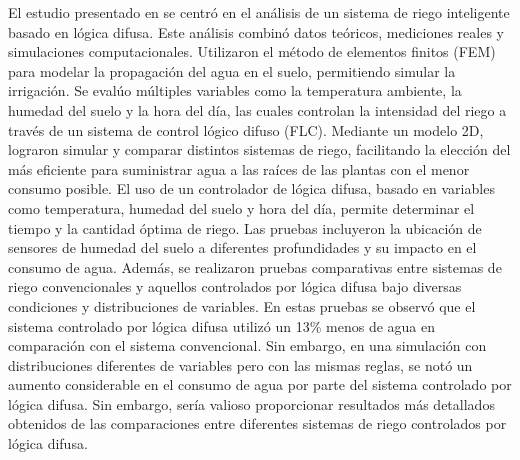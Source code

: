 \bigbreak
El estudio presentado en \cite{neugebauer_fuzzy_2023} se centró en el análisis de un sistema de riego inteligente basado en lógica difusa. Este análisis combinó datos teóricos, mediciones reales y simulaciones computacionales. Utilizaron el método de elementos finitos (FEM) para modelar la propagación del agua en el suelo, permitiendo simular la irrigación. Se evalúo múltiples variables como la temperatura ambiente, la humedad del suelo y la hora del día, las cuales controlan la intensidad del riego a través de un sistema de control lógico difuso (FLC). Mediante un modelo 2D, lograron simular y comparar distintos sistemas de riego, facilitando la elección del más eficiente para suministrar agua a las raíces de las plantas con el menor consumo posible. El uso de un controlador de lógica difusa, basado en variables como temperatura, humedad del suelo y hora del día, permite determinar el tiempo y la cantidad óptima de riego. Las pruebas incluyeron la ubicación de sensores de humedad del suelo a diferentes profundidades y su impacto en el consumo de agua. Además, se realizaron pruebas comparativas entre sistemas de riego convencionales y aquellos controlados por lógica difusa bajo diversas condiciones y distribuciones de variables. En estas pruebas se observó que el sistema controlado por lógica difusa utilizó un 13\% menos de agua en comparación con el sistema convencional. Sin embargo, en una simulación con distribuciones diferentes de variables pero con las mismas reglas, se notó un aumento considerable en el consumo de agua por parte del sistema controlado por lógica difusa. Sin embargo, sería valioso proporcionar resultados más detallados obtenidos de las comparaciones entre diferentes sistemas de riego controlados por lógica difusa. 

